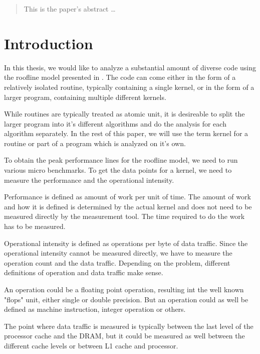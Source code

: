\documentclass[12pt]{article}
\begin{document}
\maketitle

\begin{abstract}
This is the paper's abstract \ldots
\end{abstract}

\tableofcontents

\section{Introduction}
In this thesis, we would like to analyze a substantial amount of diverse code using the roofline model presented in \cite{Roofline}. The code can come either in the form of a relatively isolated routine, typically containing a single kernel, or in the form of a larger program, containing multiple different kernels.

While routines are typically treated as atomic unit, it is desireable to split the larger program into it's different algorithms and do the analysis for each algorithm separately. In the rest of this paper, we will use the term kernel for a routine or part of a program which is analyzed on it's own.

To obtain the peak performance lines for the roofline model, we need to run various micro benchmarks. To get the data points for a kernel, we need to measure the performance and the operational intensity. 

Performance is defined as amount of work per unit of time. The amount of work and how it is defined is determined by the actual kernel and does not need to be measured directly by the measurement tool. The time required to do the work has to be measured.

Operational intensity is defined as operations per byte of data traffic. Since the operational intensity cannot be measured directly, we have to measure the operation count and the data traffic. Depending on the problem, different definitions of operation and data traffic make sense.

An operation could be a floating point operation, resulting int the well known "flops" unit, either single or double precision. But an operation could as well be defined as machine instruction, integer operation or others.

The point where data traffic is measured is typically between the last level of the processor cache and the DRAM, but it could be measured as well between the different cache levels or between L1 cache and processor.
\end{document}
